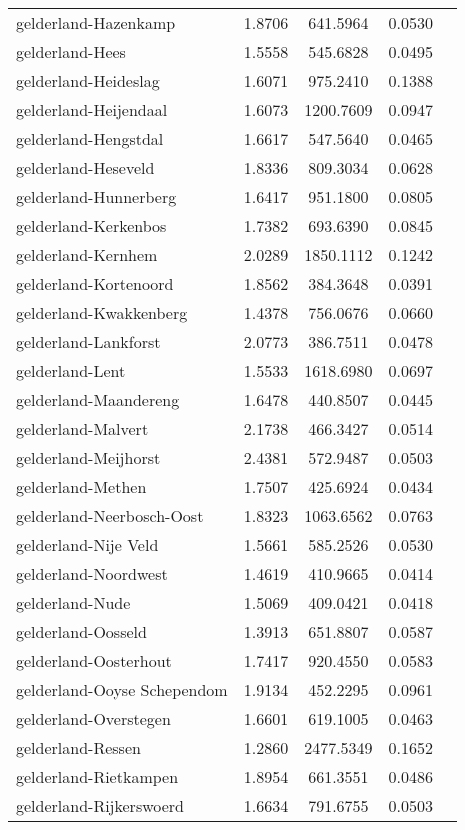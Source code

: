 \begin{longtable}{llccc}
gelderland-Hazenkamp & 1.8706 & 641.5964 & 0.0530 \\
gelderland-Hees & 1.5558 & 545.6828 & 0.0495 \\
gelderland-Heideslag & 1.6071 & 975.2410 & 0.1388 \\
gelderland-Heijendaal & 1.6073 & 1200.7609 & 0.0947 \\
gelderland-Hengstdal & 1.6617 & 547.5640 & 0.0465 \\
gelderland-Heseveld & 1.8336 & 809.3034 & 0.0628 \\
gelderland-Hunnerberg & 1.6417 & 951.1800 & 0.0805 \\
gelderland-Kerkenbos & 1.7382 & 693.6390 & 0.0845 \\
gelderland-Kernhem & 2.0289 & 1850.1112 & 0.1242 \\
gelderland-Kortenoord & 1.8562 & 384.3648 & 0.0391 \\
gelderland-Kwakkenberg & 1.4378 & 756.0676 & 0.0660 \\
gelderland-Lankforst & 2.0773 & 386.7511 & 0.0478 \\
gelderland-Lent & 1.5533 & 1618.6980 & 0.0697 \\
gelderland-Maandereng & 1.6478 & 440.8507 & 0.0445 \\
gelderland-Malvert & 2.1738 & 466.3427 & 0.0514 \\
gelderland-Meijhorst & 2.4381 & 572.9487 & 0.0503 \\
gelderland-Methen & 1.7507 & 425.6924 & 0.0434 \\
gelderland-Neerbosch-Oost & 1.8323 & 1063.6562 & 0.0763 \\
gelderland-Nije Veld & 1.5661 & 585.2526 & 0.0530 \\
gelderland-Noordwest & 1.4619 & 410.9665 & 0.0414 \\
gelderland-Nude & 1.5069 & 409.0421 & 0.0418 \\
gelderland-Oosseld & 1.3913 & 651.8807 & 0.0587 \\
gelderland-Oosterhout & 1.7417 & 920.4550 & 0.0583 \\
gelderland-Ooyse Schependom & 1.9134 & 452.2295 & 0.0961 \\
gelderland-Overstegen & 1.6601 & 619.1005 & 0.0463 \\
gelderland-Ressen & 1.2860 & 2477.5349 & 0.1652 \\
gelderland-Rietkampen & 1.8954 & 661.3551 & 0.0486 \\
gelderland-Rijkerswoerd & 1.6634 & 791.6755 & 0.0503 \\

\end{longtable}
